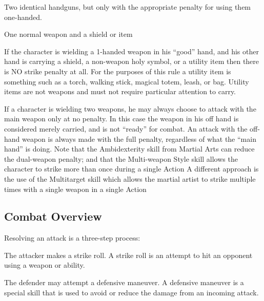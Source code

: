 \documentclass[twoside]{book}
\begin{document}
                       Two identical handguns, but only with the
                       appropriate penalty for using them one-handed.
                       
                      
                    
                  
                
                
                   One normal weapon and a shield or item
                   
                    If the character is wielding a 1-handed weapon
                   in his “good” hand, and his other hand is
                   carrying a shield, a non-weapon holy symbol, or a
                   utility item then there is NO strike penalty at all.
                   For the purposes of this rule a utility item is
                   something such as a torch, walking stick, magical
                   totem, leash, or bag. Utility items are not weapons
                   and must not require particular attention to carry.
                   
                
             If a character is wielding two weapons, he may
               always choose to attack with the main weapon only at no
               penalty. In this case the weapon in his off hand is
               considered merely carried, and is not “ready”
               for combat. An attack with the off-hand weapon is always
               made with the full penalty, regardless of what the
               “main hand” is doing.  Note that the Ambidexterity skill from Martial Arts
               can reduce the dual-weapon penalty; and that the
               Multi-weapon Style skill allows the character to strike
               more than once during a single Action A different approach
               is the use of the Multitarget skill which allows the
               martial artist to strike multiple times with a single
               weapon in a single Action 
\subsection{Combat Overview}
     Resolving an attack is a three-step process:   
                
                   The attacker makes a strike roll. A strike roll
                   is an attempt to hit an opponent using a weapon or
                   ability. 
                
                
                   The defender may attempt a defensive maneuver. A
                   defensive maneuver is a special skill that is used to
                   avoid or reduce the damage from an incoming attack.
                   
\end{document}
